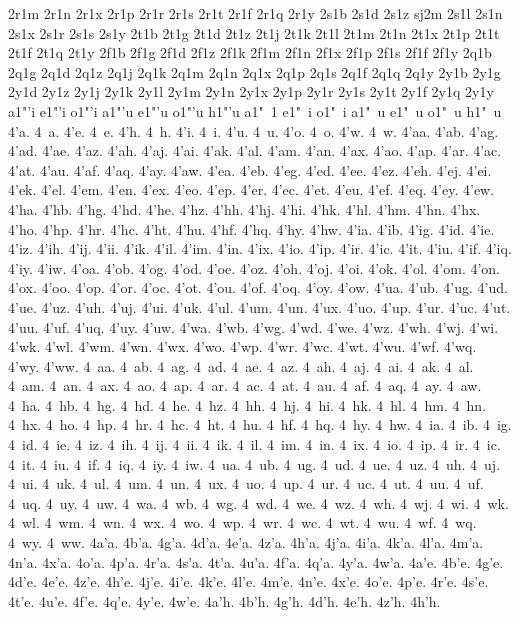 {2r1m
2r1n
2r1x
2r1p
2r1r
2r1s
2r1t
2r1f
2r1q
2r1y
2s1b
2s1d
2s1z
sj2m
2s1l
2s1n
2s1x
2s1r
2s1s
2s1y
2t1b
2t1g
2t1d
2t1z
2t1j
2t1k
2t1l
2t1m
2t1n
2t1x
2t1p
2t1t
2t1f
2t1q
2t1y
2f1b
2f1g
2f1d
2f1z
2f1k
2f1m
2f1n
2f1x
2f1p
2f1s
2f1f
2f1y
2q1b
2q1g
2q1d
2q1z
2q1j
2q1k
2q1m
2q1n
2q1x
2q1p
2q1s
2q1f
2q1q
2q1y
2y1b
2y1g
2y1d
2y1z
2y1j
2y1k
2y1l
2y1m
2y1n
2y1x
2y1p
2y1r
2y1s
2y1t
2y1f
2y1q
2y1y
a1"'i
e1"'i
o1"'i
a1"'u
e1"'u
o1"'u
h1"'u
a1"~1
e1"~i
o1"~i
a1"~u
e1"~u
o1"~u
h1"~u
4'a.
4~a.
4'e.
4~e.
4'h.
4~h.
4'i.
4~i.
4'u.
4~u.
4'o.
4~o.
4'w.
4~w.
4'aa.
4'ab.
4'ag.
4'ad.
4'ae.
4'az.
4'ah.
4'aj.
4'ai.
4'ak.
4'al.
4'am.
4'an.
4'ax.
4'ao.
4'ap.
4'ar.
4'ac.
4'at.
4'au.
4'af.
4'aq.
4'ay.
4'aw.
4'ea.
4'eb.
4'eg.
4'ed.
4'ee.
4'ez.
4'eh.
4'ej.
4'ei.
4'ek.
4'el.
4'em.
4'en.
4'ex.
4'eo.
4'ep.
4'er.
4'ec.
4'et.
4'eu.
4'ef.
4'eq.
4'ey.
4'ew.
4'ha.
4'hb.
4'hg.
4'hd.
4'he.
4'hz.
4'hh.
4'hj.
4'hi.
4'hk.
4'hl.
4'hm.
4'hn.
4'hx.
4'ho.
4'hp.
4'hr.
4'hc.
4'ht.
4'hu.
4'hf.
4'hq.
4'hy.
4'hw.
4'ia.
4'ib.
4'ig.
4'id.
4'ie.
4'iz.
4'ih.
4'ij.
4'ii.
4'ik.
4'il.
4'im.
4'in.
4'ix.
4'io.
4'ip.
4'ir.
4'ic.
4'it.
4'iu.
4'if.
4'iq.
4'iy.
4'iw.
4'oa.
4'ob.
4'og.
4'od.
4'oe.
4'oz.
4'oh.
4'oj.
4'oi.
4'ok.
4'ol.
4'om.
4'on.
4'ox.
4'oo.
4'op.
4'or.
4'oc.
4'ot.
4'ou.
4'of.
4'oq.
4'oy.
4'ow.
4'ua.
4'ub.
4'ug.
4'ud.
4'ue.
4'uz.
4'uh.
4'uj.
4'ui.
4'uk.
4'ul.
4'um.
4'un.
4'ux.
4'uo.
4'up.
4'ur.
4'uc.
4'ut.
4'uu.
4'uf.
4'uq.
4'uy.
4'uw.
4'wa.
4'wb.
4'wg.
4'wd.
4'we.
4'wz.
4'wh.
4'wj.
4'wi.
4'wk.
4'wl.
4'wm.
4'wn.
4'wx.
4'wo.
4'wp.
4'wr.
4'wc.
4'wt.
4'wu.
4'wf.
4'wq.
4'wy.
4'ww.
4~aa.
4~ab.
4~ag.
4~ad.
4~ae.
4~az.
4~ah.
4~aj.
4~ai.
4~ak.
4~al.
4~am.
4~an.
4~ax.
4~ao.
4~ap.
4~ar.
4~ac.
4~at.
4~au.
4~af.
4~aq.
4~ay.
4~aw.
4~ha.
4~hb.
4~hg.
4~hd.
4~he.
4~hz.
4~hh.
4~hj.
4~hi.
4~hk.
4~hl.
4~hm.
4~hn.
4~hx.
4~ho.
4~hp.
4~hr.
4~hc.
4~ht.
4~hu.
4~hf.
4~hq.
4~hy.
4~hw.
4~ia.
4~ib.
4~ig.
4~id.
4~ie.
4~iz.
4~ih.
4~ij.
4~ii.
4~ik.
4~il.
4~im.
4~in.
4~ix.
4~io.
4~ip.
4~ir.
4~ic.
4~it.
4~iu.
4~if.
4~iq.
4~iy.
4~iw.
4~ua.
4~ub.
4~ug.
4~ud.
4~ue.
4~uz.
4~uh.
4~uj.
4~ui.
4~uk.
4~ul.
4~um.
4~un.
4~ux.
4~uo.
4~up.
4~ur.
4~uc.
4~ut.
4~uu.
4~uf.
4~uq.
4~uy.
4~uw.
4~wa.
4~wb.
4~wg.
4~wd.
4~we.
4~wz.
4~wh.
4~wj.
4~wi.
4~wk.
4~wl.
4~wm.
4~wn.
4~wx.
4~wo.
4~wp.
4~wr.
4~wc.
4~wt.
4~wu.
4~wf.
4~wq.
4~wy.
4~ww.
4a'a.
4b'a.
4g'a.
4d'a.
4e'a.
4z'a.
4h'a.
4j'a.
4i'a.
4k'a.
4l'a.
4m'a.
4n'a.
4x'a.
4o'a.
4p'a.
4r'a.
4s'a.
4t'a.
4u'a.
4f'a.
4q'a.
4y'a.
4w'a.
4a'e.
4b'e.
4g'e.
4d'e.
4e'e.
4z'e.
4h'e.
4j'e.
4i'e.
4k'e.
4l'e.
4m'e.
4n'e.
4x'e.
4o'e.
4p'e.
4r'e.
4s'e.
4t'e.
4u'e.
4f'e.
4q'e.
4y'e.
4w'e.
4a'h.
4b'h.
4g'h.
4d'h.
4e'h.
4z'h.
4h'h.
}
